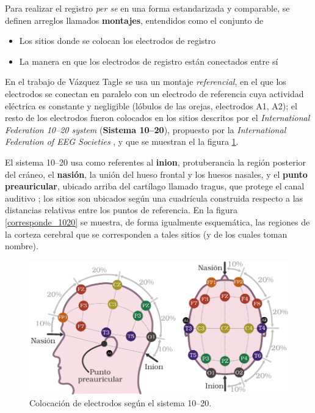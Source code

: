 Para realizar el registro \textit{per se} en una forma estandarizada y comparable, se definen
arreglos llamados \textbf{montajes}, entendidos como el conjunto de 
\begin{itemize}
\item Los sitios donde se colocan los electrodos de registro
\item La manera en que los electrodos de registro están conectados entre sí
\end{itemize}

En el trabajo de Vázquez Tagle \cite{VazquezTagle16} se usa un montaje \textit{referencial}, en el 
que los electrodos se conectan en paralelo con un electrodo de referencia cuya actividad eléctrica 
es constante y negligible (lóbulos de las orejas, electrodos A1, A2);
el resto de los electrodos fueron colocados en los sitios descritos por el \textit{International 
Federation 10--20 system} (\textbf{Sistema 10--20}), propuesto por la \textit{International 
Federation of EEG Societies} \cite{Jasper58,Klem99,AASM07}, y que se muestran el la figura \ref{img1020}.

El sistema 10--20 usa como referentes al \textbf{inion}, protuberancia la región posterior del 
cráneo, el \textbf{nasión}, la unión del hueso frontal y los huesos nasales, y el \textbf{punto 
preauricular}, ubicado arriba del cartílago llamado tragus, que protege el canal auditivo ; los 
sitios son ubicados según una cuadrícula construida respecto a las distancias 
relativas entre los puntos de referencia.
En la figura \ref{corresponde_1020} se muestra, de forma igualmente esquemática, las regiones de la 
corteza cerebral que se corresponden a tales sitios (y de los cuales toman nombre).

\begin{figure}
\centering
\includegraphics[width=\linewidth]{./img_diagramas/cabeza_proporcionada_color.pdf} 
\caption{Colocación de electrodos según el sistema 10--20.
}
\label{img1020}
\end{figure}

